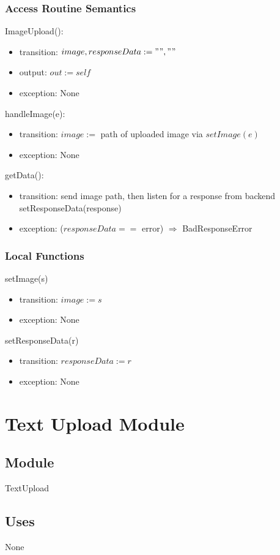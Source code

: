 \documentclass[12pt, titlepage]{article}
\begin{document}
\subsubsection{Access Routine Semantics}
ImageUpload():
\begin{itemize}
	\item transition: $image, responseData := "", ""$
	\item output: $out := self$
	\item exception: None
\end{itemize}
\noindent
handleImage(e):
\begin{itemize}
	\item transition: $image :=$ path of uploaded image via $setImage(e)$
	\item exception: None
\end{itemize}
\noindent
getData():
\begin{itemize}
	\item transition: send image path, then listen for a response from 
	backend\\ setResponseData(response)
	\item exception: ($responseData ==$ error) $\Rightarrow$ BadResponseError
\end{itemize}
\subsubsection{Local Functions}
\noindent setImage(s)
\begin{itemize}
	\item transition: $ image :=s $
	\item exception: None
\end{itemize}
\noindent setResponseData(r)
\begin{itemize}
	\item transition: $ responseData:=r $
	\item exception: None
\end{itemize}

\newpage

\section{Text Upload Module} \label{TextUpload}
\subsection{Module}
TextUpload
\subsection{Uses}
None
\end{document}
